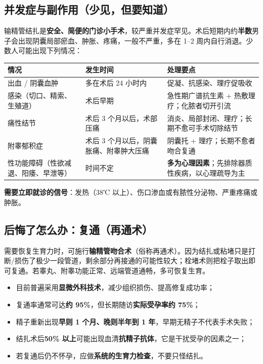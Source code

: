 \documentclass[12pt,UTF8,openany]{ctexbook}
\begin{document}
\subsection*{并发症与副作用（少见，但要知道）}

输精管结扎是\textbf{安全、简便的门诊小手术}，较严重并发症罕见。术后短期内约\textbf{半数}男子会出现阴囊局部瘀血、肿胀、疼痛，一般不严重，多在 1–2 周内自行消退。少数人可能出现下列情况：

\begin{center}
\renewcommand{\arraystretch}{1.3}
\begin{tabularx}{\textwidth}{|X|X|X|}
\hline
\textbf{情况} & \textbf{发生时间} & \textbf{处理要点} \\
\hline
出血 / 阴囊血肿 & 多在术后 24 小时内 & 促凝、抗感染、理疗促吸收 \\
\hline
感染（切口、精索、生殖道） & 术后早期 & 急性期广谱抗生素 + 热敷理疗；化脓者切开引流 \\
\hline
痛性结节 & 术后 3 个月以后，术部压痛 & 消炎、局部封闭、理疗；长期不愈可手术切除结节 \\
\hline
附睾郁积症 & 术后 3 个月以后，阴囊胀痛、附睾肿大压痛 & 阴囊托 + 理疗；长期不愈者吻合复通 \\
\hline
性功能障碍（性欲减退、阳痿、早泄等） & 时间不定 & \textbf{多为心理因素}；先排除器质性疾病，以心理疏导为主 \\
\hline
\end{tabularx}
\end{center}

\textbf{需要立即就诊的信号}：发热（38℃ 以上）、伤口渗血或有脓性分泌物、严重疼痛或肿胀。

\subsection*{后悔了怎么办：复通（再通术）}

需要恢复生育力时，可施行\textbf{输精管吻合术}（俗称再通术）。因为结扎或粘堵只是打断/损伤了极少一段管道，剩余部分再接通的可能性较大；栓堵术则把栓子取出即可复通。若睾丸、附睾功能正常、远端管道通畅，多可恢复生育。

\begin{itemize}
  \item 目前普遍采用\textbf{显微外科技术}，减少组织损伤、提高修复成功率；
  \item 复通率通常可达\textbf{约 95\%}，但长期随访\textbf{实际受孕率约 75\%}；
  \item 精子重新出现\textbf{早则 1 个月、晚则半年到 1 年}，早期无精子不代表手术失败；
  \item 结扎术后\textbf{50\% 以上}可能出现血清\textbf{抗精子抗体}，它是干扰受孕的因素之一；
  \item 若复通后仍不怀孕，应做\textbf{系统的生育力检查}，不要只怪结扎。
\end{itemize}
\end{document}
